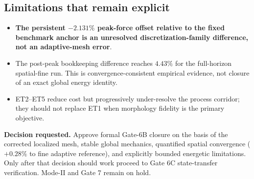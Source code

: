 \documentclass[10pt,a4paper]{article}
\newcommand{\evidencebox}[2]{%
  \begin{tcolorbox}[colback=#1!5!white,colframe=#1!70!black,boxrule=0.45pt,
    arc=1pt,left=5pt,right=5pt,top=3pt,bottom=3pt,before skip=4pt,after skip=4pt]
    \small #2
  \end{tcolorbox}}
\begin{document}
\subsection{Limitations that remain explicit}
\begin{itemize}
  \item \textbf{The persistent $-2.131\%$ peak-force offset relative to the fixed benchmark anchor is an unresolved discretization-family difference, not an adaptive-mesh error}.
  \item The post-peak bookkeeping difference reaches $4.43\%$ for the full-horizon spatial-fine run. This is convergence-consistent empirical evidence, not closure of an exact global energy identity.
  \item ET2--ET5 reduce cost but progressively under-resolve the process corridor; they should not replace ET1 when morphology fidelity is the primary objective.
\end{itemize}

\evidencebox{reportblue}{\textbf{Decision requested.} Approve formal Gate-6B closure on the basis of the corrected localized mesh, stable global mechanics, quantified spatial convergence ($+0.28\%$ to fine adaptive reference), and explicitly bounded energetic limitations. Only after that decision should work proceed to Gate 6C state-transfer verification. Mode-II and Gate 7 remain on hold.}



\end{document}
